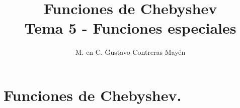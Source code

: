 
\title{Funciones de Chebyshev \\ \large {Tema 5 - Funciones especiales} \vspace{-3ex}}
\author{M. en C. Gustavo Contreras Mayén}
\date{ }

\vspace{-4cm}
\maketitle
\fontsize{14}{14}\selectfont
\tableofcontents
\newpage
\section{Funciones de Chebyshev.}


